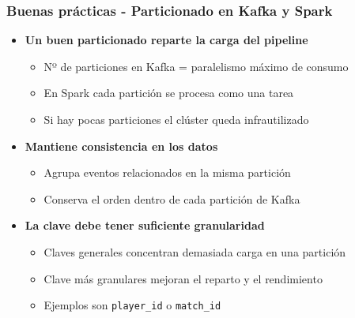 \documentclass[aspectratio=169]{beamer}
\begin{document}
\begin{frame}\frametitle{Buenas prácticas - Particionado en Kafka y Spark}
\begin{itemize}
  \item \textbf{Un buen particionado reparte la carga del pipeline}
  \begin{itemize}
    \item Nº de particiones en Kafka = paralelismo máximo de consumo
    \item En Spark cada partición se procesa como una tarea
    \item Si hay pocas particiones el clúster queda infrautilizado
  \end{itemize}

  \vspace{0.5em}

  \item \textbf{Mantiene consistencia en los datos}
  \begin{itemize}
    \item Agrupa eventos relacionados en la misma partición
    \item Conserva el orden dentro de cada partición de Kafka
  \end{itemize}

  \vspace{0.5em}

  \item \textbf{La clave debe tener suficiente granularidad}
  \begin{itemize}
    \item Claves generales concentran demasiada carga en una partición
    \item Clave más granulares mejoran el reparto y el rendimiento
    \item Ejemplos son \texttt{player\_id} o \texttt{match\_id}
  \end{itemize}
\end{itemize}
\end{frame}

\end{document}
